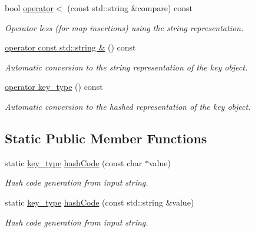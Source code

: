 \begin{DoxyCompactItemize}
bool \hyperlink{class_d_d4hep_1_1_conditions_1_1_condition_key_a609a3bb628fb06468aacf17c0390c29d}{operator$<$} (const std\+::string \&compare) const
\begin{DoxyCompactList}\small\item\em Operator less (for map insertions) using the string representation. \end{DoxyCompactList}\item 
\hyperlink{class_d_d4hep_1_1_conditions_1_1_condition_key_ac799a49354b876f279eb2b72da613d40}{operator const std\+::string \&} () const
\begin{DoxyCompactList}\small\item\em Automatic conversion to the string representation of the key object. \end{DoxyCompactList}\item 
\hyperlink{class_d_d4hep_1_1_conditions_1_1_condition_key_a665f221cfa44f24ff45df004c68b2080}{operator key\+\_\+type} () const
\begin{DoxyCompactList}\small\item\em Automatic conversion to the hashed representation of the key object. \end{DoxyCompactList}\end{DoxyCompactItemize}
\subsection*{Static Public Member Functions}
\begin{DoxyCompactItemize}
\item 
static \hyperlink{class_d_d4hep_1_1_conditions_1_1_condition_key_a08bfc8ccb807bdd5e4d9f3b065d1c8f5}{key\+\_\+type} \hyperlink{class_d_d4hep_1_1_conditions_1_1_condition_key_a1aaef3356d9fd2475b02e3c01c64e46a}{hash\+Code} (const char $\ast$value)
\begin{DoxyCompactList}\small\item\em Hash code generation from input string. \end{DoxyCompactList}\item 
static \hyperlink{class_d_d4hep_1_1_conditions_1_1_condition_key_a08bfc8ccb807bdd5e4d9f3b065d1c8f5}{key\+\_\+type} \hyperlink{class_d_d4hep_1_1_conditions_1_1_condition_key_a1420df2db54a634af5aa8a033e080c54}{hash\+Code} (const std\+::string \&value)
\begin{DoxyCompactList}\small\item\em Hash code generation from input string. \end{DoxyCompactList}\end{DoxyCompactItemize}
